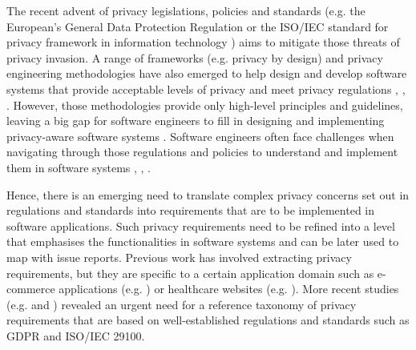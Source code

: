 The recent advent of privacy legislations, policies and standards (e.g. the European's General Data Protection Regulation \cite{OfficeJournaloftheEuropeanUnion;2016} or the ISO/IEC standard for privacy framework in information technology \cite{ISO/IEC2011}) aims to mitigate those threats of privacy invasion. A range of frameworks (e.g. privacy by design) and privacy engineering methodologies have also emerged to help design and develop software systems that provide acceptable levels of privacy and meet privacy regulations \cite{Ayala-Rivera2018}, \cite{Deng2011}, \cite{Aljeraisy2020}. However, those methodologies provide only high-level principles and guidelines, leaving a big gap for software engineers to fill in designing and implementing privacy-aware software systems \cite{Gurses2011}. Software engineers often face challenges when navigating through those regulations and policies to understand and implement them in software systems \cite{Ayala-Rivera2018}, \cite{Aljeraisy2020}, \cite{Senarath2018b}.


Hence, there is an emerging need to translate complex privacy concerns set out in regulations and standards into requirements that are to be implemented in software applications. Such privacy requirements need to be refined into a level that emphasises the functionalities in software systems and can be later used to map with issue reports. Previous work has involved extracting privacy requirements, but they are specific to a certain application domain such as e-commerce applications (e.g. \cite{Anton2002}) or healthcare websites (e.g. \cite{Antn2004}). More recent studies (e.g. \cite{Anthonysamy2017} and \cite{Guarda2009}) revealed an urgent need for a reference taxonomy of privacy requirements that are based on well-established regulations and standards such as GDPR and ISO/IEC 29100.

